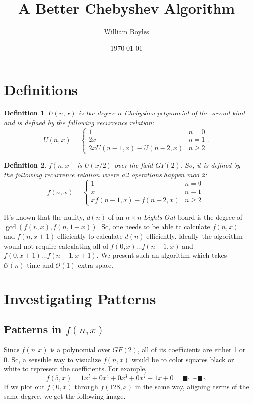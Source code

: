 \documentclass{article}
\newtheorem{definition}{Definition}
\renewcommand{\O}{\mathcal{O}}
\begin{document}
	\title{A Better Chebyshev Algorithm}
	\author{William Boyles}
	\date{\today}
	\maketitle
	
	\section{Definitions}
	\begin{definition}
		$U(n,x)$ is the degree $n$ Chebyshev polynomial of the second kind and is defined by the following recurrence relation:
		\begin{equation*}
			U(n,x) = \begin{cases}
				1 & n = 0 \\
				2x & n = 1 \\
				2x U(n-1,x) - U(n-2,x) & n \geq 2
			\end{cases}.
		\end{equation*}
	\end{definition}
	\begin{definition}
		$f(n,x)$ is $U(x/2)$ over the field $GF(2)$.
		So, it is defined by the following recurrence relation where all operations happen mod 2:
		\begin{equation*}
			f(n,x) = \begin{cases}
				1 & n = 0 \\
				x & n = 1 \\
				x f(n-1,x) - f(n-2,x) & n \geq 2
			\end{cases}.
		\end{equation*}
	\end{definition}
	It's known that the nullity, $d(n)$ of an $n \times n$ \textit{Lights Out} board is the degree of $\gcd(f(n,x), f(n,1+x))$.
	So, one needs to be able to calculate $f(n,x)$ and $f(n,x+1)$ efficiently to calculate $d(n)$ efficiently.
	Ideally, the algorithm would not require calculating all of $f(0,x) \dots f(n-1,x)$ and $f(0,x+1) \dots f(n-1,x+1)$.
	We present such an algorithm which takes $\O(n)$ time and $\O(1)$ extra space.
	
	\section{Investigating Patterns}
	\subsection{Patterns in $f(n,x)$}
	Since $f(n,x)$ is a polynomial over $GF(2)$, all of its coefficients are either 1 or 0.
	So, a sensible way to visualize $f(n,x)$ would be to color squares black or white to represent the coefficients.
	For example,
	\begin{equation*}
		f(5,x) = 1x^5 + 0x^4 + 0x^3 + 0x^2 + 1x + 0 = \blacksquare\square\square\square\square\blacksquare\square.
	\end{equation*}
	If we plot out $f(0,x)$ through $f(128,x)$ in the same way, aligning terms of the same degree, we get the following image.
	
\end{document}
